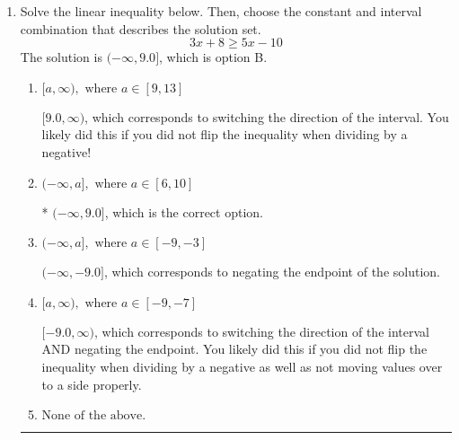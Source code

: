 \documentclass{extbook}[14pt]
\newcommand{\litem}[1]{\item #1

\rule{\textwidth}{0.4pt}}
\begin{document}
\begin{enumerate}
{\begin{enumerate}[label=\Alph*.]
$[-1.60, 3.56)$, which is the correct option.
\item \( (-\infty, a) \cup [b, \infty), \text{ where } a \in [-2.25, 1.5] \text{ and } b \in [-1.5, 6] \)

$(-\infty, -1.60) \cup [3.56, \infty)$, which corresponds to displaying the and-inequality as an or-inequality AND flipping the inequality.
\item \( (a, b], \text{ where } a \in [-2.25, -0.75] \text{ and } b \in [0, 4.5] \)

$(-1.60, 3.56]$, which corresponds to flipping the inequality.
\item \( (-\infty, a] \cup (b, \infty), \text{ where } a \in [-5.25, 0] \text{ and } b \in [1.5, 8.25] \)

$(-\infty, -1.60] \cup (3.56, \infty)$, which corresponds to displaying the and-inequality as an or-inequality.
\item \( \text{None of the above.} \)


\end{enumerate}

\textbf{General Comment:} To solve, you will need to break up the compound inequality into two inequalities. Be sure to keep track of the inequality! It may be best to draw a number line and graph your solution.
}
\litem{
Solve the linear inequality below. Then, choose the constant and interval combination that describes the solution set.
\[ 3x + 8 \geq 5x -10 \]The solution is \( (-\infty, 9.0] \), which is option B.\begin{enumerate}[label=\Alph*.]
\item \( [a, \infty), \text{ where } a \in [9, 13] \)

 $[9.0, \infty)$, which corresponds to switching the direction of the interval. You likely did this if you did not flip the inequality when dividing by a negative!
\item \( (-\infty, a], \text{ where } a \in [6, 10] \)

* $(-\infty, 9.0]$, which is the correct option.
\item \( (-\infty, a], \text{ where } a \in [-9, -3] \)

 $(-\infty, -9.0]$, which corresponds to negating the endpoint of the solution.
\item \( [a, \infty), \text{ where } a \in [-9, -7] \)

 $[-9.0, \infty)$, which corresponds to switching the direction of the interval AND negating the endpoint. You likely did this if you did not flip the inequality when dividing by a negative as well as not moving values over to a side properly.
\item \( \text{None of the above}. \)


\end{enumerate}}
\end{enumerate}
\end{document}
